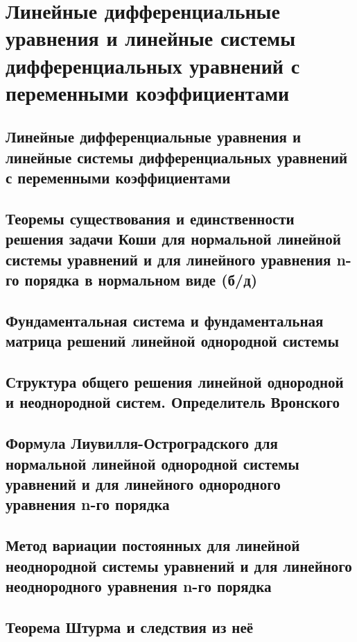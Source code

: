 \section{Линейные дифференциальные уравнения и линейные системы дифференциальных уравнений с переменными коэффициентами}
\label{varcoef-topic-anchor}

\subsection{Линейные дифференциальные уравнения и линейные системы дифференциальных уравнений с переменными коэффициентами}
\label{section-4.1}

\newpage

\subsection{Теоремы существования и единственности решения задачи Коши для нормальной линейной системы уравнений и для линейного уравнения n-го порядка в нормальном виде (б/д)}


\subsection{Фундаментальная система и фундаментальная матрица решений линейной однородной системы}

\newpage

\subsection{Структура общего решения линейной однородной и неоднородной систем.
Определитель Вронского}

\newpage

\subsection{Формула Лиувилля-Остроградского для нормальной линейной однородной системы уравнений и для линейного однородного уравнения n-го порядка}

\newpage

\subsection{Метод вариации постоянных для линейной неоднородной системы уравнений и для линейного неоднородного уравнения n-го порядка}


\newpage
\subsection{Теорема Штурма и следствия из неё}

\newpage

